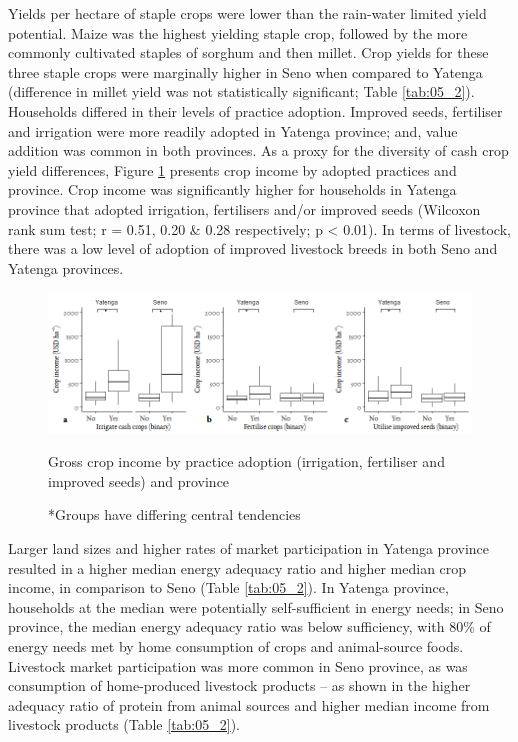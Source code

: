 Yields per hectare of staple crops were lower than the rain-water limited yield potential. Maize was the highest yielding staple crop, followed by the more commonly cultivated staples of sorghum and then millet. Crop yields for these three staple crops were marginally higher in Seno when compared to Yatenga (difference in millet yield was not statistically significant; Table \ref{tab:05_2}). Households differed in their levels of practice adoption. Improved seeds, fertiliser and irrigation were more readily adopted in Yatenga province; and, value addition was common in both provinces. As a proxy for the diversity of cash crop yield differences, Figure \ref{fig:05_1} presents crop income by adopted practices and province. Crop income was significantly higher for households in Yatenga province that adopted irrigation, fertilisers and/or improved seeds (Wilcoxon rank sum test; r = 0.51, 0.20 \& 0.28 respectively; p {\textless} 0.01). In terms of livestock, there was a low level of adoption of improved livestock breeds in both Seno and Yatenga provinces.

\begin{figure}[H]
  \includegraphics[width=1\textwidth]{figs_05/image2.png}
  \captionsetup{singlelinecheck = off, justification=justified}
  \caption{Gross crop income by practice adoption (irrigation, fertiliser and improved seeds) and province}
  \label{fig:05_1}
  \vspace*{-3mm}
  \caption*{*Groups have differing central tendencies}
\end{figure}


Larger land sizes and higher rates of market participation in Yatenga province resulted in a higher median energy adequacy ratio and higher median crop income, in comparison to Seno (Table \ref{tab:05_2}). In Yatenga province, households at the median were potentially self-sufficient in energy needs; in Seno province, the median energy adequacy ratio was below sufficiency, with 80\% of energy needs met by home consumption of crops and animal-source foods. Livestock market participation was more common in Seno province, as was consumption of home-produced livestock products -- as shown in the higher adequacy ratio of protein from animal sources and higher median income from livestock products (Table \ref{tab:05_2}).

